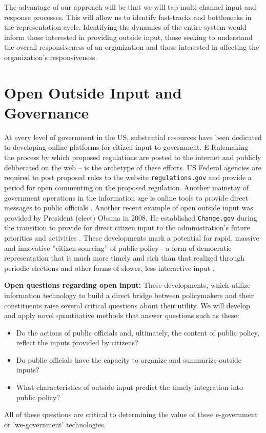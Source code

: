 The advantage of our approach will be that we will tap multi-channel input and response processes. This will allow us to identify fast-tracks and bottlenecks in the representation cycle. Identifying the dynamics of the entire system would inform those interested in providing outside input, those seeking to understand the overall responsiveness of an organization and those interested in affecting the organization's responsiveness.



\section{Open Outside Input and Governance}

At every level of government in the US, substantial resources have been dedicated to developing online platforms for citizen input to government. E-Rulemaking \cite{Coglianese2004} -- the process by which proposed regulations are posted to the internet and publicly deliberated on the web -- is the archetype of these efforts. US Federal agencies are required to post proposed rules to the website \texttt{regulations.gov} and provide a period for open commenting on the proposed regulation. Another mainstay of government operations in the information age is online tools to provide direct messages to public officials \cite{Balla2007}. Another recent example of open outside input was provided by President (elect) Obama in 2008. He established \texttt{Change.gov} during the transition to provide for direct citizen input to the administration's future priorities and activities \cite{Borins2009}. These developments mark a potential for rapid, massive and innovative ''citizen-sourcing'' of public policy - a form of democratic representation that is much more timely and rich than that realized through periodic elections and other forms of slower, less interactive input  \cite{Linders2012}.

{\bf Open questions regarding open input:} These developments, which utilize information technology to build a direct bridge between policymakers and their constituents raise several critical questions about their utility. We will develop and apply novel quantitative methods that answer questions such as these:
\begin{itemize}
\item Do the actions of public officials and, ultimately, the content of public policy, reflect the inputs provided by citizens?
\item Do public officials have the capacity to organize and summarize outside inputs?
\item What characteristics of outside input predict the timely integration into public policy?
\end{itemize} All of these questions are critical to determining the value of these e-government or 'we-government' technologies.


